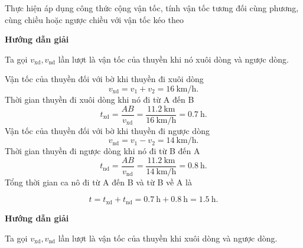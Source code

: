 \begin{dang}{Thực hiện áp dụng công thức cộng vận tốc, tính vận tốc tương đối cùng phương, cùng chiều hoặc ngược chiều với vận tốc kéo theo}
	{	\begin{center}
			\textbf{Hướng dẫn giải}
		\end{center}
		
		Ta gọi $v_{\text{xd}}, v_{\text{nd}}$ lần lượt là vận tốc của thuyền khi nó xuôi dòng và ngược dòng.
		
		Vận tốc của thuyền đối với bờ khi thuyền đi xuôi dòng 
		$$v_{\text{xd}}=v_1+v_2 = \SI{16}{\kilo\meter/\hour}.$$
		Thời gian thuyền đi xuôi dòng khi nó đi từ A đến B
		$$t_{\text{xd}}=\dfrac{AB}{v_{\text{xd}}}=\dfrac{\SI{11.2}{\kilo\meter}}{\SI{16}{\kilo\meter/\hour}}=\SI{0.7}{\hour}.$$
		Vận tốc của thuyền đối với bờ khi thuyền đi ngược dòng 
		$$v_{\text{nd}}=v_1-v_2 = \SI{14}{\kilo\meter/\hour}.$$
		Thời gian thuyền đi ngược dòng khi nó đi từ B đến A
		$$t_{\text{nd}}=\dfrac{AB}{v_{\text{nd}}}=\dfrac{\SI{11.2}{\kilo\meter}}{\SI{14}{\kilo\meter/\hour}}=\SI{0.8}{\hour}.$$
		Tổng thời gian ca nô đi từ A đến B và từ B về A là
		
		$$t= t_{\text{xd}}+ t_{\text{nd}}=\SI{0.7}{\hour}+\SI{0.8}{\hour}=\SI{1.5}{\hour}.$$
	}
	{	\begin{center}
			\textbf{Hướng dẫn giải}
		\end{center}
		
		Ta gọi $v_{\text{xd}}, v_{\text{nd}}$ lần lượt là vận tốc của thuyền khi xuôi dòng và ngược dòng.
		
}
\end{dang}
